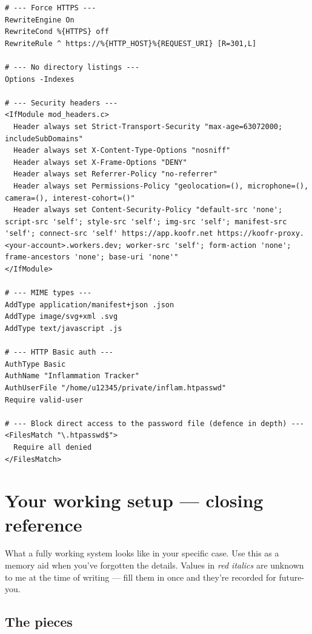 \documentclass[11pt,a4paper]{article}
\begin{document}
\begin{lstlisting}[language=htaccess]
# --- Force HTTPS ---
RewriteEngine On
RewriteCond %{HTTPS} off
RewriteRule ^ https://%{HTTP_HOST}%{REQUEST_URI} [R=301,L]

# --- No directory listings ---
Options -Indexes

# --- Security headers ---
<IfModule mod_headers.c>
  Header always set Strict-Transport-Security "max-age=63072000; includeSubDomains"
  Header always set X-Content-Type-Options "nosniff"
  Header always set X-Frame-Options "DENY"
  Header always set Referrer-Policy "no-referrer"
  Header always set Permissions-Policy "geolocation=(), microphone=(), camera=(), interest-cohort=()"
  Header always set Content-Security-Policy "default-src 'none'; script-src 'self'; style-src 'self'; img-src 'self'; manifest-src 'self'; connect-src 'self' https://app.koofr.net https://koofr-proxy.<your-account>.workers.dev; worker-src 'self'; form-action 'none'; frame-ancestors 'none'; base-uri 'none'"
</IfModule>

# --- MIME types ---
AddType application/manifest+json .json
AddType image/svg+xml .svg
AddType text/javascript .js

# --- HTTP Basic auth ---
AuthType Basic
AuthName "Inflammation Tracker"
AuthUserFile "/home/u12345/private/inflam.htpasswd"
Require valid-user

# --- Block direct access to the password file (defence in depth) ---
<FilesMatch "\.htpasswd$">
  Require all denied
</FilesMatch>
\end{lstlisting}

\section{Your working setup --- closing reference}

What a fully working system looks like in your specific case. Use this as a memory aid when you've forgotten the details. Values in \textit{\color{red!70!black}red italics} are unknown to me at the time of writing --- fill them in once and they're recorded for future-you.

\subsection{The pieces}
\end{document}
